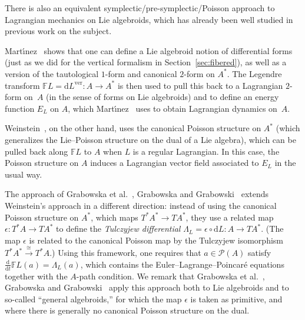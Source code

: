 \documentclass[10pt,a4paper]{amsart}
\numberwithin{equation}{section}
\begin{document}
\begin{Remark} \label{rmk:poisson} There is also an equivalent symplectic/pre-symplectic/Poisson approach to Lagrangian mechanics on Lie algebroids, which has already been well studied in previous work on the subject.

Mart\'{\i}nez~\cite{Martinez2001} shows that one can def\/ine a Lie algebroid notion of dif\/ferential forms (just as we did for the vertical formalism in Section~\ref{sec:fibered}), as well as a version of the tautological $1$-form and canonical $2$-form on $ A ^\ast $. The Legendre transform $ \mathbb{F} L = \mathrm{d} L ^\text{ver} \colon A \rightarrow A ^\ast $ is then used to pull this back to a Lagrangian $2$-form on~$A$ (in the sense of forms on Lie algebroids) and to def\/ine an energy function $ E _L $ on $A$, which Mart\'{\i}nez~\cite{Martinez2001} uses to obtain Lagrangian dynamics on~$A$.

Weinstein~\cite{Weinstein1996}, on the other hand, uses the canonical Poisson structure on $ A ^\ast $ (which generalizes the Lie--Poisson structure on the dual of a Lie algebra), which can be pulled back along $ \mathbb{F} L $ to $ A $ when $L$ is a regular Lagrangian. In this case, the Poisson structure on $A$ induces a Lagrangian vector f\/ield associated to $ E _L $ in the usual way.

The approach of Grabowska et al.~\cite{GrUrGr2006}, Grabowska and Grabowski~\cite{GrGr2008} extends Weinstein's approach in a dif\/ferent direction: instead of using the canonical Poisson structure on $ A ^\ast $, which maps $ T ^\ast A ^\ast \rightarrow T A ^\ast $, they use a related map $ \epsilon \colon T ^\ast A \rightarrow T A ^\ast $ to def\/ine the \emph{Tulczyjew differential} $ \Lambda _L = \epsilon \circ \mathrm{d} L \colon A \rightarrow T A ^\ast $. (The map $\epsilon$ is related to the canonical Poisson map by the Tulczyjew isomorphism $ T ^\ast A ^\ast \xrightarrow{\cong} T ^\ast A $.) Using this framework, one requires that $ a \in \mathcal{P} (A) $ satisfy $ \frac{\mathrm{d}}{\mathrm{d}t} \mathbb{F} L (a) = \Lambda _L (a) $, which contains the Euler--Lagrange--Poincar\'e equations together with the $A$-path condition. We remark that Grabowska et al.~\cite{GrUrGr2006}, Grabowska and Grabowski~\cite{GrGr2008} apply this approach both to Lie algebroids and to so-called ``general algebroids,'' for which the map $\epsilon$ is taken as primitive, and where there is generally no canonical Poisson structure on the dual.
\end{Remark}
\end{document}
